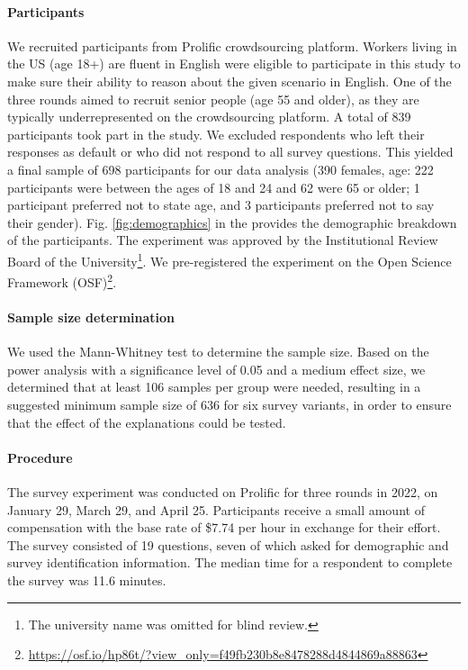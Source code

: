 \paragraph{Participants}\label{sec:participants}
We recruited participants from Prolific crowdsourcing platform. Workers living in the US (age 18+) are fluent in English were eligible to participate in this study to make sure their ability to reason about the given scenario in English. One of the three rounds aimed to recruit senior people (age 55 and older), as they are typically underrepresented on the crowdsourcing platform. A total of 839 participants took part in the study. We excluded respondents who left their responses as default or who did not respond to all survey questions. This yielded a final sample of 698 participants for our data analysis (390 females, age: 222 participants were between the ages of 18 and 24 and 62 were 65 or older; 1 participant preferred not to state age, and 3 participants preferred not to say their gender). Fig. \ref{fig:demographics} in the  provides the demographic breakdown of the participants. The experiment was approved by the Institutional Review Board of the University\footnote{The university name was omitted for blind review.}. We pre-registered the experiment on the Open Science Framework (OSF)\footnote{\url{https://osf.io/hp86t/?view_only=f49fb230b8e8478288d4844869a88863}}. 

\paragraph{Sample size determination}
We used the Mann-Whitney test to determine the sample size. Based on the power analysis with a significance level of 0.05 and a medium effect size, we determined that at least 106 samples per group were needed, resulting in a suggested minimum sample size of 636 for six survey variants, in order to ensure that the effect of the explanations could be tested.

\paragraph{Procedure}
The survey experiment was conducted on Prolific for three rounds in 2022, on January 29, March 29, and April 25. Participants receive a small amount of compensation with the base rate of \$7.74 per hour in exchange for their effort. The survey consisted of 19 questions, seven of which asked for demographic and survey identification information. The median time for a respondent to complete the survey was 11.6 minutes. 

